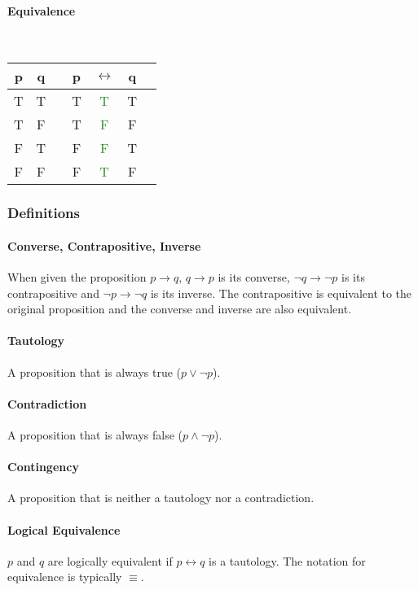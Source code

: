 \documentclass[a4paper, 10pt]{article}
\begin{document}
\begin{multicols}{3}
\paragraph{Equivalence}\mbox{}\\
\begin{tabular}{@{ }c@{ }@{ }c | c@{ }@{ }c@{ }@{ }c@{ }@{ }c@{ }@{ }c}
p & q &  & p & \(\leftrightarrow\) & q & \\
\hline
T & T &  & T & \textcolor{ForestGreen}{T} & T & \\
T & F &  & T & \textcolor{ForestGreen}{F} & F & \\
F & T &  & F & \textcolor{ForestGreen}{F} & T & \\
F & F &  & F & \textcolor{ForestGreen}{T} & F & \\
\end{tabular}
\end{multicols}
\subsubsection{Definitions}
\paragraph{Converse, Contrapositive, Inverse}
When given the proposition \( p\rightarrow q \), \( q\rightarrow p \) is its converse, \( \neg q\rightarrow \neg p \) is its contrapositive and \( \neg p\rightarrow \neg q \) is its inverse. The contrapositive is equivalent to the original proposition and the converse and inverse are also equivalent.

\paragraph{Tautology}
A proposition that is always true (\(p\lor\neg p\)).

\paragraph{Contradiction}
A proposition that is always false (\(p\land\neg p\)).

\paragraph{Contingency}
A proposition that is neither a tautology nor a contradiction.

\paragraph{Logical Equivalence}
\(p\) and \(q\) are logically equivalent if \(p\leftrightarrow q\) is a tautology. The notation for equivalence is typically \(\equiv\).
\newpage
\end{document}
